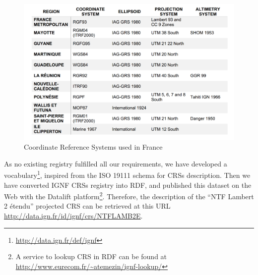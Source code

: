 \begin{figure}[!htbp]
 \begin{center}
  \includegraphics[width=120mm]{img/crs-france.png}
  \caption{Coordinate Reference Systems used in France}%
  \label{fig:crsinfr}
 \end{center}
\end{figure}
 
As no existing registry fulfilled all our requirements, we have developed a vocabulary\footnote{\url{http://data.ign.fr/def/ignf}}, inspired from the ISO 19111 schema for CRSs description. Then we have converted IGNF CRSs registry into RDF, and published this dataset on the Web with the Datalift platform\footnote{A service to lookup CRS in RDF can be found at \url{http://www.eurecom.fr/~atemezin/ignf-lookup/}}. Therefore, the description of the ``NTF Lambert 2 \'{e}tendu'' projected CRS can be retrieved at this URL \url{http://data.ign.fr/id/ignf/crs/NTFLAMB2E}.


